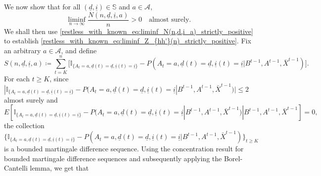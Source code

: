 We now show that for all $(\underline{d}, \underline{i})\in \mathbb{S}$ and $a\in\mathcal{A}$,
\begin{equation}
	\liminf\limits_{n\to\infty}\frac{N(n,\underline{d},\underline{i},a)}{n}>0\quad \text{almost surely}.\label{restless_with_known_eq:liminf_N(n,d,i_a)_strictly_positive}
\end{equation}
We shall then use \eqref{restless_with_known_eq:liminf_N(n,d,i_a)_strictly_positive} to establish \eqref{restless_with_known_eq:liminf_Z_{hh'}(n)_strictly_positive}. Fix an arbitrary $a\in\mathcal{A}$, and define
\begin{equation}
	S(n,\underline{d},\underline{i},a)\coloneqq \sum\limits_{t=K}^{n}\bigg[\mathbb{I}_{\{A_t=a,\underline{d}(t)=\underline{d},\underline{i}(t)=\underline{i}\}}-P(A_t=a,\underline{d}(t)=\underline{d},\underline{i}(t)=\underline{i}|B^{t-1},A^{t-1},\bar{X}^{t-1})\bigg].\label{restless_with_known_eq:S(n,d,i.a)}
\end{equation}
For each $t\geq K$, since $|\mathbb{I}_{\{A_t=a,\underline{d}(t)=\underline{d},\underline{i}(t)=\underline{i}\}}-P(A_t=a,\underline{d}(t)=\underline{d},\underline{i}(t)=\underline{i}|B^{t-1},A^{t-1},\bar{X}^{t-1})|\leq 2$ almost surely and $$E[\mathbb{I}_{\{A_t=a,\underline{d}(t)=\underline{d},\underline{i}(t)=\underline{i}\}}-P(A_t=a,\underline{d}(t)=\underline{d},\underline{i}(t)=\underline{i}|B^{t-1},A^{t-1},\bar{X}^{t-1})|B^{t-1}, A^{t-1},\bar{X}^{t-1}]=0,$$ the collection $\{\mathbb{I}_{\{A_t=a,\underline{d}(t)=\underline{d},\underline{i}(t)=\underline{i}\}}-P(A_t=a,\underline{d}(t)=\underline{d},\underline{i}(t)=\underline{i}|B^{t-1},A^{t-1},\bar{X}^{t-1})\}_{t\geq K}$ is a bounded martingale difference sequence. Using the concentration result \cite[Theorem 1.2A]{Victor1999} for bounded martingale difference sequences and subsequently applying the Borel-Cantelli lemma, we get that
